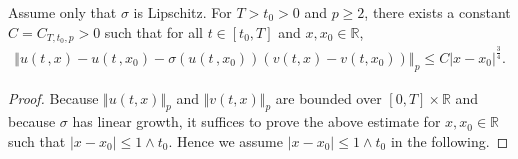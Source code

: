 \documentclass[12pt,a4paper]{article}
\newcommand{\R}{{\mathbb{R}}}
\newcommand{\<}{\langle}
\renewcommand{\>}{\rangle}
\begin{document}
\begin{lemma}\label{lem:spatial}
Assume only that $\sigma$ is Lipschitz. For $T> t_0 > 0$ and $p\geq2$, there exists a constant $C = C_{T,t_0,p}>0$ such that for all $t\in [t_0, T]$ and $x, x_0\in \R$,
\begin{align*}
          \left\Vert u(t\,,x)- u(t\,, x_0)-\sigma(u(t\,,x_0))(v(t,x)-v(t,x_0)) \right\Vert_p
           \leq C |x-x_0|^{\frac{3}{4}}.
 \end{align*}
 \end{lemma}
 \begin{proof}
Because $\Vert u(t, x) \Vert_p$ and $\Vert v(t, x) \Vert_p$ are bounded over $[0, T] \times \R$ \cite[Theorem 4.1]{dss} and because $\sigma$ has linear growth, it suffices to prove the above estimate for $x, x_0\in \R$ such that $|x-x_0|\leq 1\wedge t_0$.  Hence we assume $|x-x_0|\leq 1\wedge t_0$ in the following. 
           

\end{proof}
\end{document}
